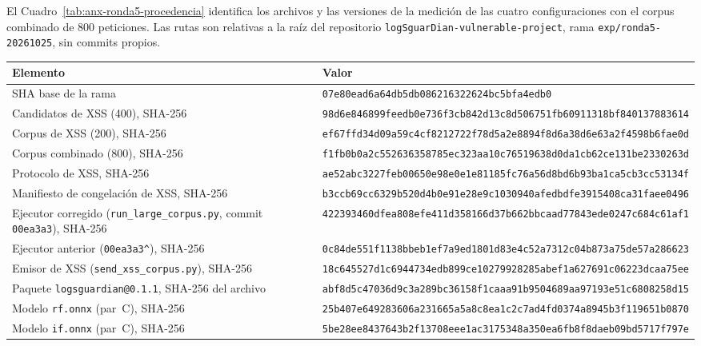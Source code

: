 El Cuadro~\ref{tab:anx-ronda5-procedencia} identifica los archivos y las versiones de la medición
de las cuatro configuraciones con el corpus combinado de 800 peticiones. Las rutas son relativas a
la raíz del repositorio \texttt{logSguarDian-vulnerable-project}, rama
\texttt{exp/ronda5-20261025}, sin commits propios.

\begin{table}[H]
\centering
\small
\begin{tabular}{|L{4.2cm}|L{9.3cm}|}
\hline
\textbf{Elemento} & \textbf{Valor} \\ \hline
SHA base de la rama & {\scriptsize\texttt{07e80ead6a64db5db086216322624bc5bfa4edb0}} \\ \hline
Candidatos de XSS (400), SHA-256 & {\scriptsize\texttt{98d6e846899feedb0e736f3cb842d13c8d506751fb60911318bf840137883614}} \\ \hline
Corpus de XSS (200), SHA-256 & {\scriptsize\texttt{ef67ffd34d09a59c4cf8212722f78d5a2e8894f8d6a38d6e63a2f4598b6fae0d}} \\ \hline
Corpus combinado (800), SHA-256 & {\scriptsize\texttt{f1fb0b0a2c552636358785ec323aa10c76519638d0da1cb62ce131be2330263d}} \\ \hline
Protocolo de XSS, SHA-256 & {\scriptsize\texttt{ae52abc3227feb00650e98e0e1e81185fc76a56d8bd6b93ba1ca5cb3cc53134f}} \\ \hline
Manifiesto de congelación de XSS, SHA-256 & {\scriptsize\texttt{b3ccb69cc6329b520d4b0e91e28e9c1030940afedbdfe3915408ca31faee0496}} \\ \hline
Ejecutor corregido (\texttt{run\_large\_corpus.py}, commit \texttt{00ea3a3}), SHA-256 & {\scriptsize\texttt{422393460dfea808efe411d358166d37b662bbcaad77843ede0247c684c61af1}} \\ \hline
Ejecutor anterior (\texttt{00ea3a3\^{}}), SHA-256 & {\scriptsize\texttt{0c84de551f1138bbeb1ef7a9ed1801d83e4c52a7312c04b873a75de57a286623}} \\ \hline
Emisor de XSS (\texttt{send\_xss\_corpus.py}), SHA-256 & {\scriptsize\texttt{18c645527d1c6944734edb899ce10279928285abef1a627691c06223dcaa75ee}} \\ \hline
Paquete \texttt{logsguardian@0.1.1}, SHA-256 del archivo & {\scriptsize\texttt{abf8d5c47036d9c3a289bc36158f1caaa91b9504689aa97193e51c6808258d15}} \\ \hline
Modelo \texttt{rf.onnx} (par~C), SHA-256 & {\scriptsize\texttt{25b407e649283606a231665a5a8c8ea1c2c7ad4fd0374a8945b3f119651b0870}} \\ \hline
Modelo \texttt{if.onnx} (par~C), SHA-256 & {\scriptsize\texttt{5be28ee8437643b2f13708eee1ac3175348a350ea6fb8f8daeb09bd5717f797e}} \\ \hline

\end{tabular}
\end{table}

